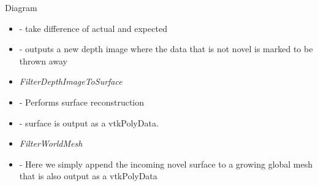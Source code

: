 \begin{frame}{Diagram}
{\begin{itemize}
    \item - take difference of actual and expected
    \item - outputs a new depth image where the data that is not novel is marked
    to be thrown away
    \item \textit{FilterDepthImageToSurface}
    \item - Performs surface reconstruction
    \item - surface is output as a vtkPolyData.
    \item \textit{FilterWorldMesh}
    \item - Here we simply append the incoming novel surface to a growing global
    mesh that is also output as a vtkPolyData
  \end{itemize}}
\end{frame}
